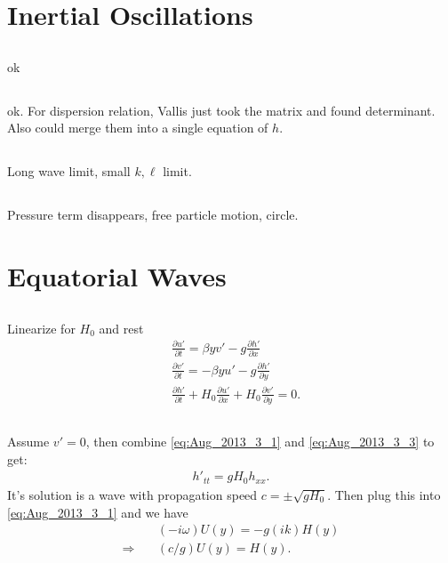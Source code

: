 \documentclass[11pt,letterpaper]{book}
\theoremstyle{definition}
\newcommand{\pe}{\partial}
\newcommand{\thus}{\Rightarrow \quad }
\begin{document}
\section{Inertial Oscillations}
\subsection{}
ok

\subsection{}
ok. For dispersion relation, Vallis just took the matrix and found determinant. Also could merge them into a single equation of $h$.

\subsection{}
Long wave limit, small $k,\ell$ limit.

\subsection{}
Pressure term disappears, free particle motion, circle.

\section{Equatorial Waves}
\subsection{}
Linearize for $H_0$ and rest
\begin{align}
    &\frac{\pe u'}{\pe t} = \beta y v'-g\frac{\pe h'}{\pe x}\label{eq:Aug_2013_3_1}\\
    &\frac{\pe v'}{\pe t} = -\beta y u'-g\frac{\pe h'}{\pe y}\label{eq:Aug_2013_3_2}\\
    &\frac{\pe h'}{\pe t} + H_0\frac{\pe u'}{\pe x}+H_0\frac{\pe v'}{\pe y} = 0.\label{eq:Aug_2013_3_3}
\end{align}

\subsection{}
Assume $v' = 0$, then combine \eqref{eq:Aug_2013_3_1} and \eqref{eq:Aug_2013_3_3} to get:
\begin{align*}
    h'_{tt} = gH_0 h_{xx}.
\end{align*}
It's solution is a wave with propagation speed $c = \pm\sqrt{gH_0}$. Then plug this into \eqref{eq:Aug_2013_3_1} and we have
\begin{align*}
    &(-i\omega)U(y) = -g(ik)H(y)\\
    \thus &(c/g)U(y) = H(y).
\end{align*}
\end{document}
